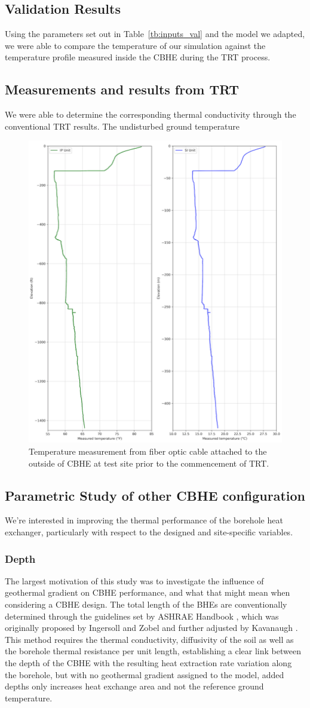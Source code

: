 \subsection{Validation Results}
	Using the parameters set out in Table~\ref{tb:inputs_val} and the model we adapted, we were able to compare the temperature of our simulation against the temperature profile measured inside the CBHE during the TRT process. 
\subsection{Measurements and results from TRT}
	We were able to determine the corresponding thermal conductivity through the conventional TRT results. The undisturbed ground temperature 
	\begin{figure}[h!]
	\centering
	\includegraphics[height=0.5\textwidth]{data/groudref}
	\caption{Temperature measurement from fiber optic cable attached to the outside of CBHE at test site prior to the commencement of TRT.}	
	\end{figure}


\subsection{Parametric Study of other CBHE configuration}
	We're interested in improving the thermal performance of the borehole heat exchanger, particularly with respect to the designed and site-specific variables. 
	\subsubsection{Depth}
	    The largest motivation of this study was to investigate the influence of geothermal gradient on CBHE performance, and what that might mean when considering a CBHE design. The total length of the BHEs are conventionally determined through the guidelines set by ASHRAE Handbook \cite{american_society_of_heating_refrigerating_and_air-conditioning_engineers_2013_2013}, which was originally proposed by Ingersoll and Zobel \cite{ingersoll_heat_1955} and further adjusted by Kavanaugh \cite{kavanaugh_simulation_1985}. This method requires the thermal conductivity, diffusivity of the soil as well as the borehole thermal resistance per unit length, establishing a clear link between the depth of the CBHE with the resulting heat extraction rate variation along the borehole, but with no geothermal gradient assigned to the model, added depths only increases heat exchange area and not the reference ground temperature.
            
